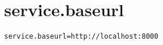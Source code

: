 \section{service.baseurl}
\label{configuration:ServiceBaseurl}
\AvailableInJavaAndCsharp{\TODO}
\begin{lstlisting}[style=Props,caption={Usage example for \textit{service.baseurl}}]
service.baseurl=http://localhost:8000
\end{lstlisting}